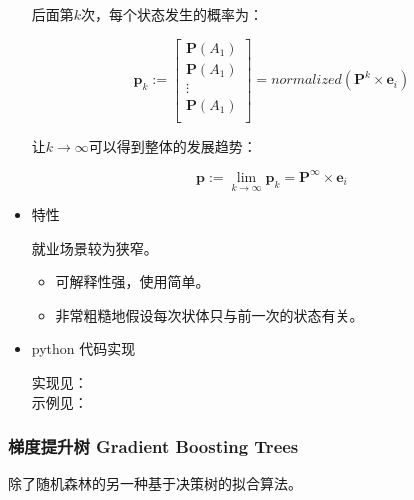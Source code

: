 \documentclass{article}
\begin{document}
\begin{itemize}
后面第$k$次，每个状态发生的概率为：

\[\mathbf{p}_k :=\begin{bmatrix}
    \mathbf{P}(A_1)\\
    \mathbf{P}(A_1)\\
    \vdots\\
    \mathbf{P}(A_1)\\
\end{bmatrix} = normalized(\mathbf{P}^k\times \mathbf{e}_i)\]

让$k\rightarrow \infty$可以得到整体的发展趋势：

\[\mathbf{p} := \lim_{k\rightarrow \infty}\mathbf{p}_k = \mathbf{P}^\infty \times \mathbf{e}_i\]

\item{特性}

就业场景较为狭窄。

\begin{itemize}
    \item  可解释性强，使用简单。
    \item 非常粗糙地假设每次状体只与前一次的状态有关。
\end{itemize}

\item{python 代码实现}

实现见：\\
示例见：

\end{itemize}

\subsubsection{梯度提升树 Gradient Boosting Trees}

除了随机森林的另一种基于决策树的拟合算法。
\end{document}
